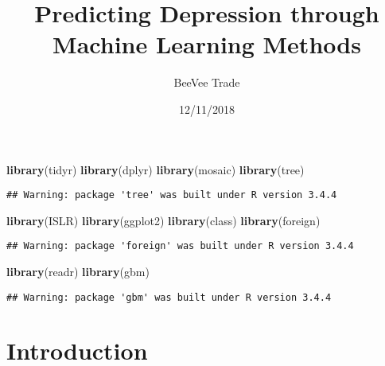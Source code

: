 \documentclass[]{article}
\title{Predicting Depression through Machine Learning Methods}
\author{BeeVee Trade}
\date{12/11/2018}
\newenvironment{Shaded}{\begin{snugshade}}{\end{snugshade}}
\newcommand{\KeywordTok}[1]{\textcolor[rgb]{0.13,0.29,0.53}{\textbf{#1}}}
\newcommand{\NormalTok}[1]{#1}
\begin{document}
\maketitle

\begin{Shaded}
\begin{Highlighting}[]
\KeywordTok{library}\NormalTok{(tidyr)}
\KeywordTok{library}\NormalTok{(dplyr)}
\KeywordTok{library}\NormalTok{(mosaic)}
\KeywordTok{library}\NormalTok{(tree)}
\end{Highlighting}
\end{Shaded}

\begin{verbatim}
## Warning: package 'tree' was built under R version 3.4.4
\end{verbatim}

\begin{Shaded}
\begin{Highlighting}[]
\KeywordTok{library}\NormalTok{(ISLR)}
\KeywordTok{library}\NormalTok{(ggplot2)}
\KeywordTok{library}\NormalTok{(class)}
\KeywordTok{library}\NormalTok{(foreign)}
\end{Highlighting}
\end{Shaded}

\begin{verbatim}
## Warning: package 'foreign' was built under R version 3.4.4
\end{verbatim}

\begin{Shaded}
\begin{Highlighting}[]
\KeywordTok{library}\NormalTok{(readr)}
\KeywordTok{library}\NormalTok{(gbm)}
\end{Highlighting}
\end{Shaded}

\begin{verbatim}
## Warning: package 'gbm' was built under R version 3.4.4
\end{verbatim}

\section{Introduction}\label{introduction}
\end{document}
